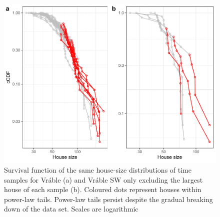 \documentclass[
  12pt,
  a4paper, twoside]{book}
\begin{document}
\begin{figure}

{\centering \includegraphics[width=0.9\linewidth]{bookdown-demo_files/figure-latex/06-time-tails-1} 

}

\caption[Power-law tails, Vráble time samples]{Survival function of the same house-size distributions of time samples for Vráble (a) and Vráble SW only excluding the largest house of each sample (b). Coloured dots represent houses within power-law tails. Power-law tails persist despite the gradual breaking down of the data set. Scales are logarithmic}\label{fig:06-time-tails}
\end{figure}
\end{document}
